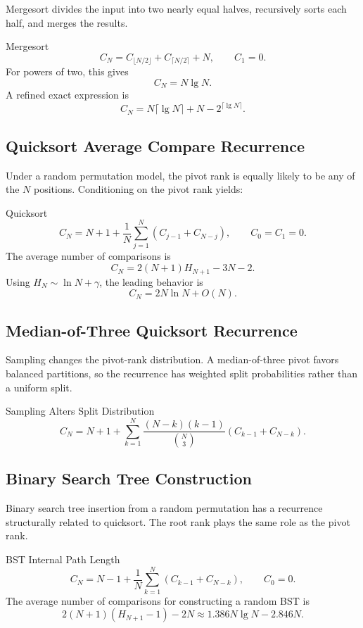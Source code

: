\documentclass[11pt]{article}
\begin{document}
Mergesort divides the input into two nearly equal halves, recursively sorts each half, and merges the results.

\begin{mathbox}{Mergesort}
\[
C_N = C_{\lfloor N/2\rfloor}+C_{\lceil N/2\rceil}+N,
\qquad C_1=0.
\]
For powers of two, this gives
\[
C_N=N\lg N.
\]
A refined exact expression is
\[
C_N = N\lceil \lg N\rceil + N - 2^{\lceil \lg N\rceil}.
\]
\end{mathbox}

\subsection{Quicksort Average Compare Recurrence}

Under a random permutation model, the pivot rank is equally likely to be any of the \(N\) positions. Conditioning on the pivot rank yields:

\begin{mathbox}{Quicksort}
\[
C_N = N+1 + \frac{1}{N}\sum_{j=1}^{N}\left(C_{j-1}+C_{N-j}\right),
\qquad C_0=C_1=0.
\]
The average number of comparisons is
\[
C_N = 2(N+1)H_{N+1}-3N-2.
\]
Using \(H_N\sim \ln N+\gamma\), the leading behavior is
\[
C_N = 2N\ln N + O(N).
\]
\end{mathbox}

\subsection{Median-of-Three Quicksort Recurrence}

Sampling changes the pivot-rank distribution. A median-of-three pivot favors balanced partitions, so the recurrence has weighted split probabilities rather than a uniform split.

\begin{mathbox}{Sampling Alters Split Distribution}
\[
C_N = N+1 + \sum_{k=1}^{N}
\frac{(N-k)(k-1)}{\binom{N}{3}}
\left(C_{k-1}+C_{N-k}\right).
\]
\end{mathbox}

\subsection{Binary Search Tree Construction}

Binary search tree insertion from a random permutation has a recurrence structurally related to quicksort. The root rank plays the same role as the pivot rank.

\begin{mathbox}{BST Internal Path Length}
\[
C_N = N-1 + \frac{1}{N}\sum_{k=1}^{N}\left(C_{k-1}+C_{N-k}\right),
\qquad C_0=0.
\]
The average number of comparisons for constructing a random BST is
\[
2(N+1)(H_{N+1}-1)-2N
\approx 1.386N\lg N - 2.846N.
\]
\end{mathbox}
\end{document}

